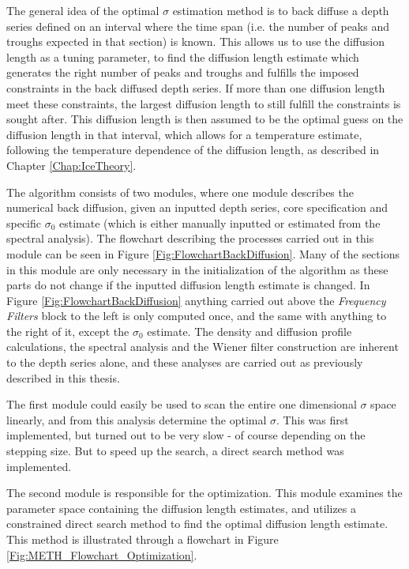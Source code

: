 \documentclass[../../CompleteThesis2/Complete_2ndDraft]{subfiles}
\begin{document}
The general idea of the optimal $\sigma$ estimation method is to back diffuse a depth series defined on an interval where the time span (i.e. the number of peaks and troughs expected in that section) is known. This allows us to use the diffusion length as a tuning parameter, to find the diffusion length estimate which generates the right number of peaks and troughs and fulfills the imposed constraints in the back diffused depth series. If more than one diffusion length meet these constraints, the largest diffusion length to still fulfill the constraints is sought after. This diffusion length is then assumed to be the optimal guess on the diffusion length in that interval, which allows for a temperature estimate, following the temperature dependence of the diffusion length, as described in Chapter \ref{Chap:IceTheory}.

The algorithm consists of two modules, where one module describes the numerical back diffusion, given an inputted depth series, core specification and specific $\sigma_0$ estimate (which is either manually inputted or estimated from the spectral analysis). The flowchart describing the processes carried out in this module can be seen in Figure \ref{Fig:FlowchartBackDiffusion}. Many of the sections in this module are only necessary in the initialization of the algorithm as these parts do not change if the inputted diffusion length estimate is changed. In Figure \ref{Fig:FlowchartBackDiffusion} anything carried out above the \textit{Frequency Filters} block to the left is only computed once, and the same with anything to the right of it, except the $\sigma_0$ estimate. The density and diffusion profile calculations, the spectral analysis and the Wiener filter construction are inherent to the depth series alone, and these analyses are carried out as previously described in this thesis.

The first module could easily be used to scan the entire one dimensional $\sigma$ space linearly, and from this analysis determine the optimal $\sigma$. This was first implemented, but turned out to be very slow - of course depending on the stepping size. But to speed up the search, a direct search method was implemented.

The second module is responsible for the optimization. This module examines the parameter space containing the diffusion length estimates, and utilizes a constrained direct search method to find the optimal diffusion length estimate. This method is illustrated through a flowchart in Figure \ref{Fig:METH_Flowchart_Optimization}. 
\end{document}
